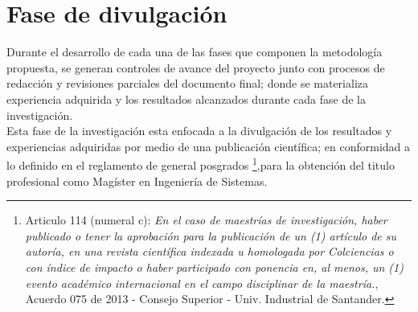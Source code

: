

\section{Fase de divulgación}

Durante el desarrollo de cada una de las fases que componen la metodología propuesta, se generan controles de avance del proyecto junto con procesos de redacción y revisiones parciales del documento final; donde se materializa experiencia adquirida y los resultados alcanzados durante cada fase de la investigación.\\

Esta fase de la investigación esta enfocada a la divulgación de los resultados y experiencias adquiridas por medio de una publicación científica; en conformidad a lo definido en el reglamento de general posgrados \footnote{Articulo 114 (numeral c): \textit{En el caso de maestrías de investigación, haber publicado o tener la aprobación para la publicación de un (1) artículo de su autoría, en una revista científica indexada u homologada por Colciencias o con índice de impacto o haber participado con ponencia en, al menos, un (1) evento académico internacional en el campo disciplinar de la maestría.},  Acuerdo 075 de 2013 - Consejo Superior - Univ. Industrial de Santander.},para la obtención del titulo profesional como Magíster en Ingeniería de Sistemas. 